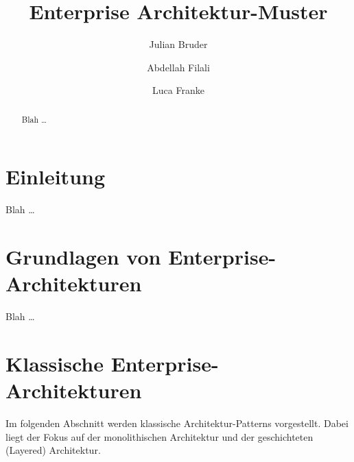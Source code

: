 \documentclass[acmtog]{acmart}
\begin{document}
\title{Enterprise Architektur-Muster}

\author{Julian Bruder}
\author{Abdellah Filali}
\authornotemark[1]
\author{Luca Franke}
\authornotemark[1]
\renewcommand{\shortauthors}{Bruder, Filali, Franke}

\begin{abstract}
Blah \ldots
\end{abstract}

\maketitle

\section{Einleitung}
Blah \ldots

\section{Grundlagen von Enterprise-Architekturen}
Blah \ldots

\section{Klassische Enterprise-Architekturen}
Im folgenden Abschnitt werden klassische Architektur-Patterns vorgestellt. Dabei liegt der Fokus auf der monolithischen 
Architektur und der geschichteten (Layered) Architektur.
\end{document}
